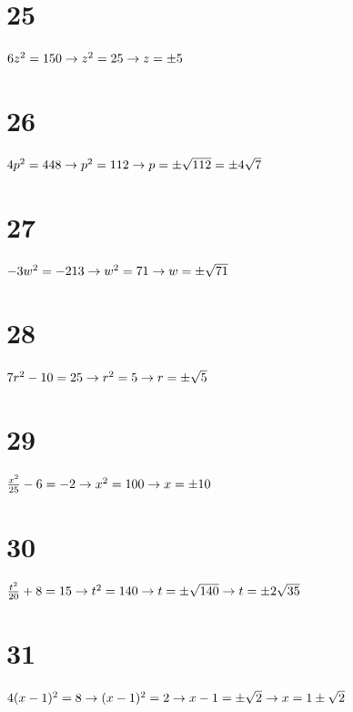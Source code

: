 \documentclass{article}
\theoremstyle{definition}
\begin{document}
\section*{25}
$6z^2=150\newline\rightarrow z^2=25\newline\rightarrow z=\pm 5$

\section*{26}
$4p^2=448\newline\rightarrow p^2=112\newline\rightarrow p=\pm \sqrt{112}=\pm 4\sqrt{7}$

\section*{27}
$-3w^2=-213\newline\rightarrow w^2=71\newline\rightarrow w=\pm \sqrt{71}$

\section*{28}
$7r^2-10=25\newline\rightarrow r^2=5\newline\rightarrow r=\pm \sqrt{5}$

\section*{29}
$\frac{x^2}{25}-6=-2\newline\rightarrow x^2=100\newline\rightarrow x=\pm 10$

\section*{30}
$\frac{t^2}{20}+8=15\newline\rightarrow t^2=140\newline\rightarrow t=\pm\sqrt{140}\newline\rightarrow t=\pm 2\sqrt{35}$

\section*{31}
$4(x-1)^2=8\newline\rightarrow (x-1)^2=2\newline\rightarrow x-1=\pm\sqrt{2}\newline\rightarrow x=1\pm\sqrt{2}$
\end{document}
